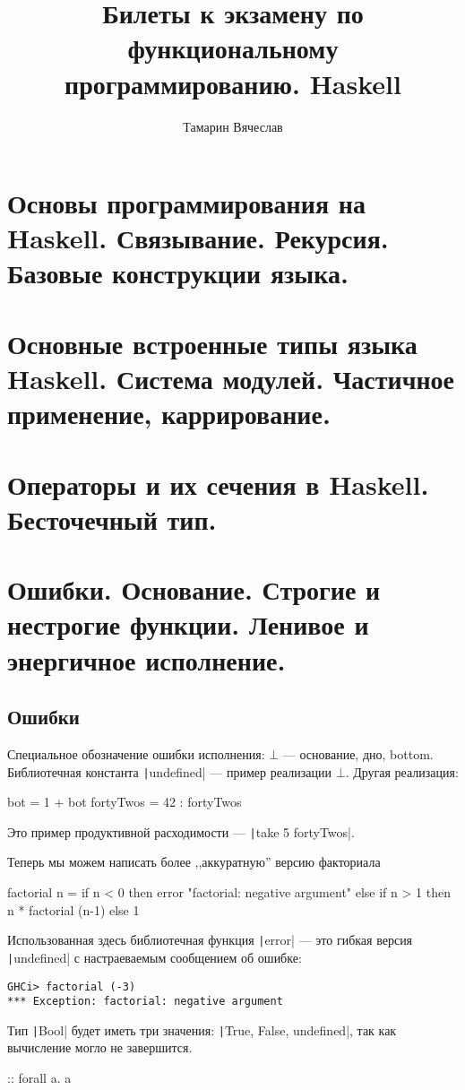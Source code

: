 \documentclass[11pt,a4paper]{article}
\title{Билеты к экзамену по функциональному программированию. Haskell}
\author{Тамарин Вячеслав}
\begin{document}
\maketitle


\section{Основы программирования на Haskell. Связывание. Рекурсия. Базовые конструкции языка.}
\section{Основные встроенные типы языка Haskell. Система модулей. Частичное применение, каррирование.}


\section{Операторы и их сечения в Haskell. Бесточечный тип.}


\section{Ошибки. Основание. Строгие и нестрогие функции. Ленивое и энергичное исполнение.}
\subsection{Ошибки}
Специальное обозначение ошибки исполнения: $ \bot$ --- основание, дно, bottom. Библиотечная константа \texttt|undefined| --- пример реализации $\bot$. Другая реализация:
\begin{hscode}
bot = 1 + bot
fortyTwos = 42 : fortyTwos
\end{hscode}
Это пример продуктивной расходимости --- \texttt|take 5 fortyTwos|.

Теперь мы можем написать более ,,аккуратную'' версию факториала
\begin{hscode}
factorial n =
	if n < 0
	then error "factorial: negative argument"
	else if n > 1
		then n * factorial (n-1)
		else 1
\end{hscode}
Использованная здесь библиотечная функция \texttt|error| --- это гибкая версия \texttt|undefined| с настраеваемым сообщением об ошибке:
\begin{verbatim}
GHCi> factorial (-3)
*** Exception: factorial: negative argument
\end{verbatim}
Тип \texttt|Bool| будет иметь три значения: \texttt|True, False, undefined|, так как вычисление могло не завершится.
\begin{hscode}
\bot :: forall {a}. a
\end{hscode}
\end{document}
